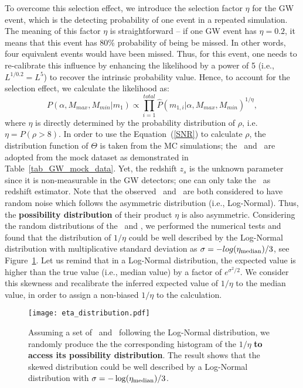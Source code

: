 \documentclass[twocolumn]{aastex62}
\newcommand{\blue}[1]{{#1}}
\begin{document}
To overcome this selection effect, we introduce the selection factor $\eta$ for the GW event, which is the detecting probability of one event in a repeated simulation. 
The meaning of this factor $\eta$ is straightforward -- if one GW event has $\eta=0.2$, it means that this event has 80\% probability of being be missed. In other words, four equivalent events would have been missed. Thus, for this event, one needs to re-calibrate \blue{this influence by enhancing the likelihood by a power of 5 (i.e., $L^{1/0.2} = L^5$) to recover the intrinsic probability value. Hence, to account for the selection effect, we calculate the likelihood as:}
 \begin{equation} \label{equ_lik_sf}
 P(\alpha, M_{max}, M_{min}|m_{1}) \propto  \prod_{i=1}^{total} \hat{P}(m_{1,i}|\alpha, M_{max}, M_{min})^{1/\eta},
 \end{equation}
where $\eta$ is directly determined by the probability distribution of $\rho$, i.e. $\eta = P(\rho>8)$. In order to \blue{use the Equation~(\ref{SNR}) to calculate $\rho$}, the distribution function of $\Theta$ is \blue{taken} from the MC simulations; the \cmass\ and \dl\ are \blue{adopted from} the mock dataset as demonstrated in Table~\ref{tab_GW_mock_data}. Yet, the redshift $z_s$ is the unknown parameter since it is non-measurable in the GW detectors; one can only take the \dl\ as redshift estimator.
\blue{Note that the observed \dl\ and \cmass\ are both considered to have random noise which follows the asymmetric distribution (i.e., Log-Normal). Thus, the {\bf possibility distribution} of their product $\eta$ is also asymmetric. Considering the random distributions of the \dl\ and \cmass, we performed the numerical tests and found that the distribution of $1/\eta$ could be well described by the Log-Normal distribution with multiplicative standard deviation as $\sigma=-log(\eta_{\rm median})/3$, see Figure~\ref{fig_eta}. Let us remind that in a Log-Normal distribution, the expected value is higher than the true value (i.e., median value) by a factor of $e^{\sigma^2/2}$.
We consider this skewness and recalibrate the inferred expected value of $1/\eta$ to the median value, in order to assign a non-biased $1/\eta$ to the calculation.
}

\begin{figure}%
\texttt{[image: eta\_distribution.pdf]}
\caption{
\blue{
Assuming a set of \dl\ and \cmass\ following the Log-Normal distribution, we randomly produce the the corresponding histogram of the $1/\eta$ {\bf to access its possibility distribution}. The result shows that the skewed distribution could be well described by a Log-Normal distribution with $\sigma = -\log(\eta_{\rm median})/3$.
}
}
\label{fig_eta}
\end{figure}
\end{document}
